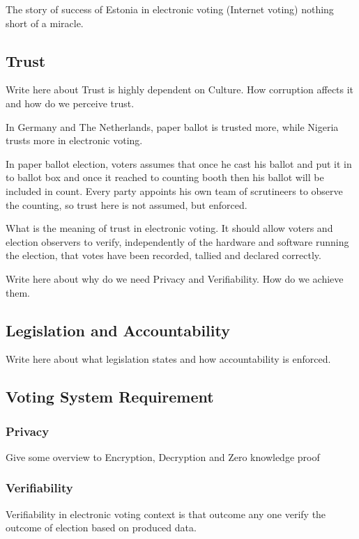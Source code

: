 	The story of success of Estonia in electronic voting (Internet
	voting) nothing short of a miracle. 

   \subsection{Trust}
    
    Write here about Trust is highly dependent on Culture. How
    corruption affects it and how do we perceive trust.    
   
   	
    
    In Germany and The Netherlands, paper ballot is trusted more, 
    while Nigeria trusts more in electronic voting. 
    
	In paper ballot election, voters assumes that once he cast his
	ballot and put it in to ballot box and once it reached to counting 
	booth then his ballot will be included in count. 
	Every party appoints his own team of scrutineers to observe 
	the counting, so trust here is not assumed, but enforced. 
		
	  
      What is the meaning of trust in electronic voting. 
       It should allow voters and election observers to verify, 
       independently of the hardware and software running the 
       election, that votes have been recorded, tallied and 
       declared correctly.
       
       Write here about why do we need Privacy and Verifiability.
       How do we achieve them.
   \subsection{Legislation and Accountability}
    Write here about what legislation states and how accountability 
    is enforced. 
   	 
   \subsection{Voting System Requirement}
   	\subsubsection{Privacy}
         Give some overview to Encryption, Decryption and 
         Zero knowledge proof
       
   	\subsubsection{Verifiability}
       Verifiability in electronic voting context is that outcome 
       any one verify the outcome of election based on produced data. 
       
